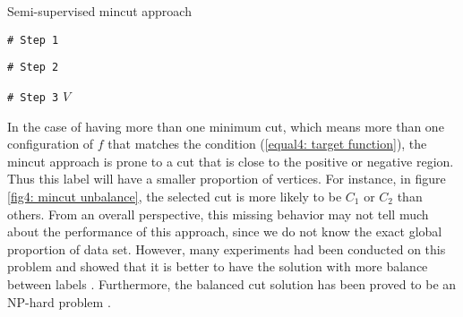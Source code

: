 \begin{algorithm}[H]
	\caption{Semi-supervised mincut approach}
	\begin{algorithmic}[1]
		\State \texttt{\# Step 1}
		\EndFor
		\EndFor
		
		\State \texttt{\# Step 2}
		
		\State \texttt{\# Step 3}
		\EndFor
		\EndFor
		\RETURN $V$
		
		\EndFunction
	\end{algorithmic}
	\label{alg4: mincut}
\end{algorithm}

In the case of having more than one minimum cut, which means more than one configuration of $f$ that matches the condition (\ref{equal4: target function}), the mincut approach is prone to a cut that is close to the positive or negative region. Thus this label will have a smaller proportion of vertices. For instance, in figure \ref{fig4: mincut unbalance}, the selected cut is more likely to be $C_1$ or $C_2$ than others. From an overall perspective, this missing behavior may not tell much about the performance of this approach, since we do not know the exact global proportion of data set. However, many experiments had been conducted on this problem and showed that it is better to have the solution with more balance between labels \parencite{Blum:2001:LLU:645530.757779, Blum:2004:SLU:1015330.1015429, Joachims:2003:TLV:3041838.3041875, Malik2000}. Furthermore, the balanced cut solution has been proved to be an NP-hard problem \parencite{Malik2000}.

